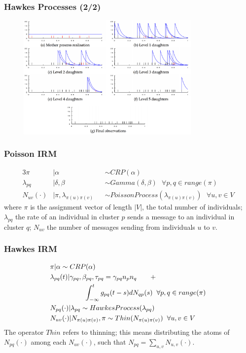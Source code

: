 \documentclass{beamer}
\begin{document}
\begin{frame}
\frametitle{Hawkes Processes (2/2)}
\begin{figure}[c]
	\includegraphics[width=0.8\textwidth]{figures/Hawkes_Imm}
\end{figure}
\end{frame}


\begin{frame}
\frametitle{Poisson IRM}
\begin{alignat}{3}
	\pi &| \alpha & &\sim CRP(\alpha)\\
	\lambda_{pq} &| \delta, \beta & &\sim Gamma(\delta,\beta) ~~~ \forall p,q \in range(\pi)\\
	N_{uv}(\cdot) &| \pi,\lambda_{\pi(u)\pi(v)} & &\sim PoissonProcess(\lambda_{\pi(u)\pi(v)}) ~~~ \forall u,v \in V
\end{alignat}
where $\pi$ is the assignment vector of length $|V|$, the total number of individuals; $\lambda_{pq}$ the rate of an individual in cluster $p$ sends a message to an individual in cluster $q$; $N_{uv}$ the number of messages sending from individuals $u$ to $v$.
\end{frame}


\begin{frame}
\frametitle{Hawkes IRM}
\begin{alignat}{3}
  &\pi | \alpha  \sim CRP(\alpha)\\
  &\lambda_{pq}(t) | \gamma_{pq},\beta_{pq},\tau_{pq}  = \gamma_{pq}n_pn_q ~~~ ~~~ + \nonumber\\ 
   &~~~ ~~~ ~~~ ~~~ ~~~\int_{-\infty}^t g_{pq}(t-s) dN_{qp}(s) \hspace{2mm}\forall p,q \in range(\pi)\\
  &N_{pq}(\cdot) | \lambda_{pq}  \sim HawkesProcess(\lambda_{pq})\\
  &N_{uv}(\cdot) | N_{\pi(u)\pi(v)}, \pi  \sim Thin(N_{\pi(u)\pi(v)}) \hspace{2mm}\forall u,v \in V
\end{alignat}
The operator $Thin$ refers to thinning; this  means distributing the atoms of $N_{pq}(\cdot)$ among each $N_{uv}(\cdot)$, such that $N_{pq} = \sum_{u,v}N_{u,v}(\cdot)$.
\end{frame}
\end{document}
